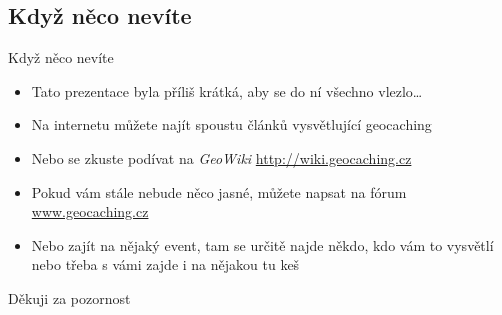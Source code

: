 \documentclass{beamer}
\begin{document}
	\subsection{Když něco nevíte}
	\begin{frame}{Když něco nevíte}
		\begin{itemize}
			\item Tato prezentace byla příliš krátká, aby se do ní všechno vlezlo\dots
			\item Na internetu můžete najít spoustu článků vysvětlující geocaching
			\item Nebo se zkuste podívat na \emph{GeoWiki} \url{http://wiki.geocaching.cz}
			\item Pokud vám stále nebude něco jasné, můžete napsat na fórum \url{www.geocaching.cz}
			\item Nebo zajít na nějaký event, tam se určitě najde někdo, kdo vám to vysvětlí nebo třeba s vámi zajde i na nějakou tu keš
		\end{itemize}
	\end{frame}
	
	\begin{frame}
		\centering
		\Huge Děkuji za pozornost
	\end{frame}
\end{document}
